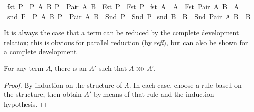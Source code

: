 \begin{implementation}
{\isacharbar}\ fst{}{\isacharcolon}\ {\isachardoublequoteopen}{\isasymlbrakk}P\ {\isachargreater}{\isachargreater}{\isachargreater}\ P{\isacharprime}{\isacharsemicolon}\ {\isacharparenleft}{\isasymAnd}A\ B{\isachardot}\ P\ {\isasymnoteq}\ Pair\ A\ B{\isacharparenright}{\isasymrbrakk}\ {\isasymLongrightarrow}\ {\isacharparenleft}Fst\ P{\isacharparenright}\ {\isachargreater}{\isachargreater}{\isachargreater}\ {\isacharparenleft}Fst\ P{\isacharprime}{\isacharparenright}{\isachardoublequoteclose}\isanewline
{\isacharbar}\ fst{}{\isacharcolon}\ {\isachardoublequoteopen}A\ {\isachargreater}{\isachargreater}{\isachargreater}\ A{\isacharprime}\ {\isasymLongrightarrow}\ {\isacharparenleft}Fst\ {\isacharparenleft}Pair\ A\ B{\isacharparenright}{\isacharparenright}\ {\isachargreater}{\isachargreater}{\isachargreater}\ A{\isacharprime}{\isachardoublequoteclose}\isanewline
{\isacharbar}\ snd{}{\isacharcolon}\ {\isachardoublequoteopen}{\isasymlbrakk}P\ {\isachargreater}{\isachargreater}{\isachargreater}\ P{\isacharprime}{\isacharsemicolon}\ {\isacharparenleft}{\isasymAnd}A\ B{\isachardot}\ P\ {\isasymnoteq}\ Pair\ A\ B{\isacharparenright}{\isasymrbrakk}\ {\isasymLongrightarrow}\ {\isacharparenleft}Snd\ P{\isacharparenright}\ {\isachargreater}{\isachargreater}{\isachargreater}\ {\isacharparenleft}Snd\ P{\isacharprime}{\isacharparenright}{\isachardoublequoteclose}\isanewline
{\isacharbar}\ snd{}{\isacharcolon}\ {\isachardoublequoteopen}B\ {\isachargreater}{\isachargreater}{\isachargreater}\ B{\isacharprime}\ {\isasymLongrightarrow}\ {\isacharparenleft}Snd\ {\isacharparenleft}Pair\ A\ B{\isacharparenright}{\isacharparenright}\ {\isachargreater}{\isachargreater}{\isachargreater}\ B{\isacharprime}{\isachardoublequoteclose}\isanewline
\end{implementation}

It is always the case that a term can be reduced by the complete development relation; this is obvious for parallel reduction (by \emph{refl}), but can also be shown for a complete development.

\begin{lemma}
For any term \(A\), there is an \(A'\) such that \(A \ggg A'\).
\end{lemma}
\begin{proof}
By induction on the structure of \(A\).
In each case, choose a rule based on the structure, then obtain \(A'\) by means of that rule and the induction hypothesis.
\end{proof}

